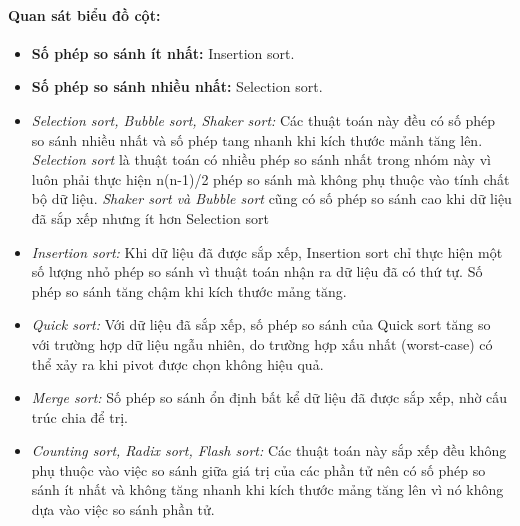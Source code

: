     \paragraph{Quan sát biểu đồ cột:}
    \begin{itemize}
        \item \textbf{Số phép so sánh ít nhất:} Insertion sort.
        \item \textbf{Số phép so sánh nhiều nhất:} Selection sort.
        \item \textit{Selection sort, Bubble sort, Shaker sort:} Các thuật toán này đều có số phép so sánh nhiều nhất và số phép tang nhanh khi kích thước mảnh tăng lên. \textit{Selection sort} là thuật toán có nhiều phép so sánh nhất trong nhóm này vì luôn phải thực hiện n(n-1)/2 phép so sánh mà không phụ thuộc vào tính chất bộ dữ liệu. \textit{ Shaker sort và Bubble sort} cũng có số phép so sánh cao khi dữ liệu đã sắp xếp nhưng ít hơn Selection sort
        \item \textit{Insertion sort: }Khi dữ liệu đã được sắp xếp, Insertion sort chỉ thực hiện một số lượng nhỏ phép so sánh vì thuật toán nhận ra dữ liệu đã có thứ tự. Số phép so sánh tăng chậm khi kích thước mảng tăng.
        \item \textit{ Quick sort:} Với dữ liệu đã sắp xếp, số phép so sánh của Quick sort tăng so với trường hợp dữ liệu ngẫu nhiên, do trường hợp xấu nhất (worst-case) có thể xảy ra khi pivot được chọn không hiệu quả.
        \item \textit{Merge sort: }Số phép so sánh ổn định bất kể dữ liệu đã được sắp xếp, nhờ cấu trúc chia để trị.
        \item \textit{Counting sort, Radix sort, Flash sort:} Các thuật toán này sắp xếp đều không phụ thuộc vào việc so sánh giữa giá trị của các phần tử nên có số phép so sánh ít nhất và không tăng nhanh khi kích thước mảng tăng lên vì nó không dựa vào việc so sánh phần tử.
    \end{itemize}

\newpage
